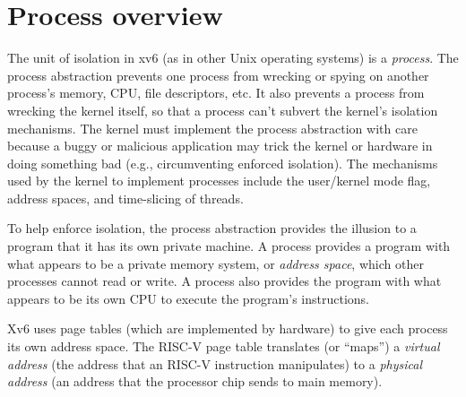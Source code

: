 \section{Process overview}

The unit of isolation in xv6 (as in other Unix operating systems) is a 
\textit{process}.
The process abstraction prevents one process from wrecking or spying on
another process's memory, CPU, file descriptors, etc.  It also prevents a process
from wrecking the kernel itself, so that a process can't subvert the kernel's
isolation mechanisms.
The kernel must implement the process abstraction with care because
a buggy or malicious application may trick the kernel or hardware in doing
something bad (e.g., circumventing enforced isolation).  The mechanisms used by
the kernel to implement processes include the user/kernel mode flag, address spaces,
and time-slicing of threads.

To help enforce isolation, the process abstraction provides the
illusion to a program that it has its own private machine.  A process provides
a program with what appears to be a private memory system, or
\textit{address space}, 
which other processes cannot read or write.
A process also provides the program with what appears to be its own
CPU to execute the program's instructions.

Xv6 uses page tables (which are implemented by hardware) to give each process
its own address space. The RISC-V page table
translates (or ``maps'') a
\textit{virtual address}
(the address that an RISC-V instruction manipulates) to a
\textit{physical address}
(an address that the processor chip sends to main memory).

